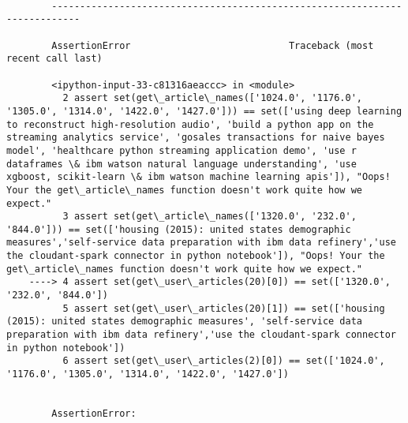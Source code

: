 \documentclass[11pt]{article}
\begin{document}
    \begin{Verbatim}[commandchars=\\\{\}]

        ---------------------------------------------------------------------------

        AssertionError                            Traceback (most recent call last)

        <ipython-input-33-c81316aeaccc> in <module>
          2 assert set(get\_article\_names(['1024.0', '1176.0', '1305.0', '1314.0', '1422.0', '1427.0'])) == set(['using deep learning to reconstruct high-resolution audio', 'build a python app on the streaming analytics service', 'gosales transactions for naive bayes model', 'healthcare python streaming application demo', 'use r dataframes \& ibm watson natural language understanding', 'use xgboost, scikit-learn \& ibm watson machine learning apis']), "Oops! Your the get\_article\_names function doesn't work quite how we expect."
          3 assert set(get\_article\_names(['1320.0', '232.0', '844.0'])) == set(['housing (2015): united states demographic measures','self-service data preparation with ibm data refinery','use the cloudant-spark connector in python notebook']), "Oops! Your the get\_article\_names function doesn't work quite how we expect."
    ----> 4 assert set(get\_user\_articles(20)[0]) == set(['1320.0', '232.0', '844.0'])
          5 assert set(get\_user\_articles(20)[1]) == set(['housing (2015): united states demographic measures', 'self-service data preparation with ibm data refinery','use the cloudant-spark connector in python notebook'])
          6 assert set(get\_user\_articles(2)[0]) == set(['1024.0', '1176.0', '1305.0', '1314.0', '1422.0', '1427.0'])


        AssertionError: 

    \end{Verbatim}
\end{document}
